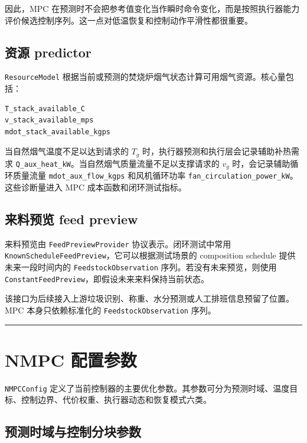 \documentclass[UTF8,openany,zihao=-4,oneside]{ctexbook}
\providecommand{\passthrough}[1]{#1}
\newcommand{\manualdivider}{\par\vspace{0.6em}\noindent\textcolor{FGLine}{\rule{\linewidth}{0.7pt}}\vspace{0.6em}\par}
\begin{document}
因此，MPC 在预测时不会把参考值变化当作瞬时命令变化，而是按照执行器能力评价候选控制序列。这一点对低温恢复和控制动作平滑性都很重要。

\subsection{资源 predictor}\label{subsec:resource-predictor-impl}

\passthrough{\lstinline!ResourceModel!} 根据当前或预测的焚烧炉烟气状态计算可用烟气资源。核心量包括：

\begin{lstlisting}
T_stack_available_C
v_stack_available_mps
mdot_stack_available_kgps
\end{lstlisting}

当自然烟气温度不足以达到请求的 \(T_g\) 时，执行器预测和执行层会记录辅助补热需求 \passthrough{\lstinline!Q_aux_heat_kW!}。当自然烟气质量流量不足以支撑请求的 \(v_g\) 时，会记录辅助循环质量流量 \passthrough{\lstinline!mdot_aux_flow_kgps!} 和风机循环功率 \passthrough{\lstinline!fan_circulation_power_kW!}。这些诊断量进入 MPC 成本函数和闭环测试指标。

\subsection{来料预览 feed preview}\label{subsec:feed-preview-impl}

来料预览由 \passthrough{\lstinline!FeedPreviewProvider!} 协议表示。闭环测试中常用 \passthrough{\lstinline!KnownScheduleFeedPreview!}，它可以根据测试场景的 composition schedule 提供未来一段时间内的 \passthrough{\lstinline!FeedstockObservation!} 序列。若没有未来预览，则使用 \passthrough{\lstinline!ConstantFeedPreview!}，即假设未来来料保持当前状态。

该接口为后续接入上游垃圾识别、称重、水分预测或人工排班信息预留了位置。MPC 本身只依赖标准化的 \passthrough{\lstinline!FeedstockObservation!} 序列。

\manualdivider

\section{NMPC 配置参数}\label{sec:nmpc-config-impl}

\passthrough{\lstinline!NMPCConfig!} 定义了当前控制器的主要优化参数。其参数可分为预测时域、温度目标、控制边界、代价权重、执行器动态和恢复模式六类。

\subsection{预测时域与控制分块参数}\label{subsec:nmpc-horizon-config}
\end{document}
